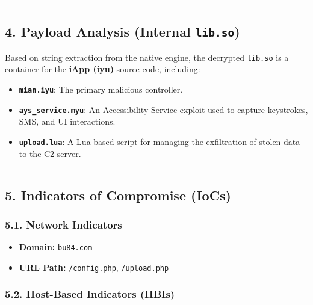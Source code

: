 \documentclass[
]{article}
\begin{document}
\begin{center}\rule{0.5\linewidth}{0.5pt}\end{center}

\subsection{\texorpdfstring{\textbf{4. Payload Analysis (Internal
\texttt{lib.so})}}{4. Payload Analysis (Internal lib.so)}}\label{4-payload-analysis-internal-libso}

Based on string extraction from the native engine, the decrypted
\texttt{lib.so} is a container for the \textbf{iApp (iyu)} source code,
including:

\begin{itemize}
\item
  \textbf{\texttt{mian.iyu}}: The primary malicious controller.
\item
  \textbf{\texttt{ays\_service.myu}}: An Accessibility Service exploit
  used to capture keystrokes, SMS, and UI interactions.
\item
  \textbf{\texttt{upload.lua}}: A Lua-based script for managing the
  exfiltration of stolen data to the C2 server.
\end{itemize}

\begin{center}\rule{0.5\linewidth}{0.5pt}\end{center}

\subsection{\texorpdfstring{\textbf{5. Indicators of Compromise
(IoCs)}}{5. Indicators of Compromise (IoCs)}}\label{5-indicators-of-compromise-iocs}

\subsubsection{\texorpdfstring{\textbf{5.1. Network
Indicators}}{5.1. Network Indicators}}\label{51-network-indicators}

\begin{itemize}
\item
  \textbf{Domain:} \texttt{bu84.com}
\item
  \textbf{URL Path:} \texttt{/config.php}, \texttt{/upload.php}
\end{itemize}

\subsubsection{\texorpdfstring{\textbf{5.2. Host-Based Indicators
(HBIs)}}{5.2. Host-Based Indicators (HBIs)}}\label{52-host-based-indicators-hbis}
\end{document}
